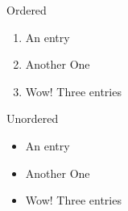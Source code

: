 \documentclass{article}
\begin{document}
Ordered
\begin{enumerate}
	\item An entry
	\item Another One
	\item Wow! Three entries
\end{enumerate}

Unordered
\begin{itemize}
	\item An entry
	\item Another One
	\item Wow! Three entries
\end{itemize}
\end{document}
